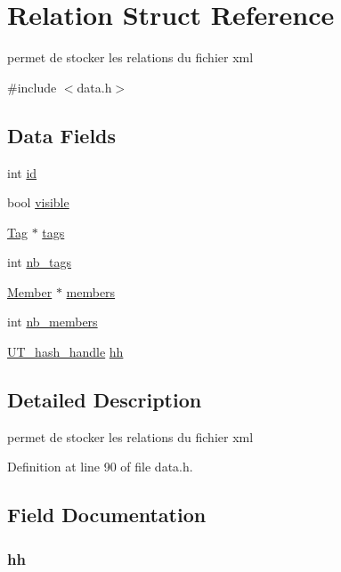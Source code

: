 \hypertarget{struct_relation}{}\section{Relation Struct Reference}
\label{struct_relation}


permet de stocker les relations du fichier xml  




{\ttfamily \#include $<$data.\+h$>$}

\subsection*{Data Fields}
\begin{DoxyCompactItemize}
\item 
int \hyperlink{struct_relation_a7441ef0865bcb3db9b8064dd7375c1ea}{id}
\item 
bool \hyperlink{struct_relation_aa54a57ae048476d840caf6d4d2c47aa3}{visible}
\item 
\hyperlink{struct_tag}{Tag} $\ast$ \hyperlink{struct_relation_a5b3cb60eeefcbc271683754bf243aebb}{tags}
\item 
int \hyperlink{struct_relation_a5090182abe45c6d1577adb6c195378f3}{nb\+\_\+tags}
\item 
\hyperlink{struct_member}{Member} $\ast$ \hyperlink{struct_relation_a78ce2941ca07db1f266125961df9ce9b}{members}
\item 
int \hyperlink{struct_relation_abe6a73091b8a8c9432bf4b149925229d}{nb\+\_\+members}
\item 
\hyperlink{struct_u_t__hash__handle}{U\+T\+\_\+hash\+\_\+handle} \hyperlink{struct_relation_a67d3d81a4f9a9622b0befade8d131661}{hh}
\end{DoxyCompactItemize}


\subsection{Detailed Description}
permet de stocker les relations du fichier xml 

Definition at line 90 of file data.\+h.



\subsection{Field Documentation}
\subsubsection[{\texorpdfstring{hh}{hh}}]{ hh}\hypertarget{struct_relation_a67d3d81a4f9a9622b0befade8d131661}{}\label{struct_relation_a67d3d81a4f9a9622b0befade8d131661}


